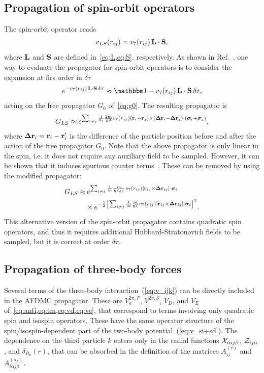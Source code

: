 \documentclass[aps,prc,twocolumn,superscriptaddress,floatfix]{revtex4-1}
\begin{document}
\subsection{Propagation of spin-orbit operators}
\label{sec:pls}
The spin-orbit operator reads
\begin{align}
v_{LS}(r_{ij})=v_7(r_{ij})\,\vb{L}\cdot\vb{S} ,
\end{align}
where $\vb{L}$ and $\vb{S}$ are defined in~\cref{eq:L,eq:S}, respectively.
As shown in Ref.~\cite{Pieper:1998}, one way to evaluate
the propagator for spin-orbit operators is to consider the expansion at firs order in $\delta\tau$
\begin{align}
	e^{-v_7(r_{ij})\,\vb{L}\cdot\vb{S}\,\delta\tau}\approx\mathbbm1-v_7(r_{ij})\,\vb{L}\cdot\vb{S}\,\delta\tau ,
\end{align}
acting on the free propagator $G_0$ of~\cref{eq:g0}.
The resulting propagator is
\begin{align}
G_{LS}\approx e^{\sum_{i\ne j}\frac{1}{8i}\frac{2m}{\hbar^2}v_7(r_{ij})(\vb{r}_i-\vb{r}_j)
\times(\bm\Delta\vb{r}_i-\bm\Delta\vb{r}_j)\cdot(\bm\sigma_i+\bm\sigma_j)} ,
\end{align}
where $\bm\Delta\vb{r}_i=\vb{r}_i-\vb{r}_i'$ is the difference of the particle position before and after the
action of the free propagator $G_0$.
Note that the above propagator is only linear in the spin, i.e. it does not require any
auxiliary field to be sampled.
However, it can be shown that it induces spurious counter terms~\cite{Sarsa:2003}.
These can be removed by using the modified propagator:
\begin{align}
G_{LS}\approx &\,e^{\sum_{i\neq j}\frac{1}{4i}\frac{m}{\hbar^2\delta\tau}v_7(r_{ij})
[\vb{r}_{ij}\times\bm\Delta\vb{r}_{ij}]\cdot\bm\sigma_i}
\nonumber \\
&\times e^{-\frac{1}{2}\left[\sum_{i\neq j}\frac{1}{4i}\frac{m}{\hbar^2}v_7(r_{ij})
[\vb{r}_{ij}\times\bm\Delta\vb{r}_{ij}]\cdot\bm\sigma_i\right]^2} .
\end{align}
This alternative version of the spin-orbit propagator contains quadratic spin operators,
and thus it requires additional Hubbard-Stratonovich fields to be sampled, but it is 
correct at order $\delta\tau$.


\subsection{Propagation of three-body forces}
\label{sec:p3}
Several terms of the three-body interaction~(\ref{eq:v_ijk}) can be directly included in the AFDMC propagator. 
These are $V_a^{2\pi,P}$, $V^{2\pi,S}$, $V_D$, and $V_E$ of~\cref{eq:anti,eq:tm,eq:vd,eq:ve},
that correspond to terms involving only quadratic spin and isospin operators.
These have the same operator structure of the spin/isospin-dependent part of the
two-body potential~(\ref{eq:v_si+sd}). The dependence on the third particle $k$ enters only in the radial
functions ${\cal X}_{i\alpha j\beta}$, ${\cal Z}_{ij\alpha}$, and $\delta_{R_0}(r)$,
that can be absorbed in the definition of the
matrices $A^{(\tau)}_{ij}$ and $A^{(\sigma\tau)}_{i\alpha j\beta}$.
\end{document}

